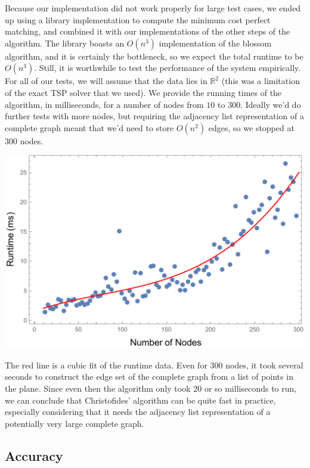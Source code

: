 \documentclass{article}
\begin{document}
Because our implementation did not work properly for large test cases, we ended up using a library implementation to compute the minimum cost perfect matching, and combined it with our implementations of the other steps of the algorithm. The library boasts an $O(n^3)$ implementation of the blossom algorithm, and it is certainly the bottleneck, so we expect the total runtime to be $O(n^3)$. Still, it is worthwhile to test the performance of the system empirically. For all of our tests, we will assume that the data lies in $\mathbb{R}^2$ (this was a limitation of the exact TSP solver that we used). We provide the running times of the algorithm, in milliseconds, for a number of nodes from $10$ to $300$. Ideally we'd do further tests with more nodes, but requiring the adjacency list representation of a complete graph meant that we'd need to store $O(n^2)$ edges, so we stopped at $300$ nodes. 

\begin{center}
\includegraphics[scale=0.8]{runtime.pdf}
\end{center}

The red line is a cubic fit of the runtime data. Even for $300$ nodes, it took several seconds to construct the edge set of the complete graph from a list of points in the plane. Since even then the algorithm only took $20$ or so milliseconds to run, we can conclude that Christofides' algorithm can be quite fast in practice, especially considering that it needs the adjacency list representation of a potentially very large complete graph.

\subsection{Accuracy}
\end{document}
